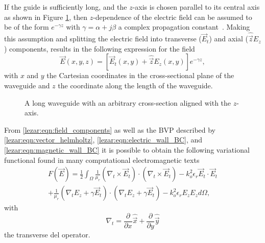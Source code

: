 If the guide is sufficiently long, and the $z$-axis is chosen parallel
to its central axis as shown in Figure \ref{lezar:fig:long_waveguide}, then
$z$-dependence of the electric field can be assumed to be of the form
$e^{-\gamma z}$ with $\gamma = \alpha + j\beta$ a complex
propagation constant~\cite{PelosiCoccioliSelleri1998,
Poz2005}.  Making this assumption and splitting the electric field
into transverse ($\vec{E}_t$) and axial ($\hat{\vec{z}}E_z$) components,
results in the following expression for the field
\begin{equation}
    \label{lezar:eqn:field_components}
    \vec{E}(x,y,z) = [\vec{E}_t(x,y) + \hat{\vec{z}}E_z(x,y)]e^{-\gamma z},
\end{equation}
with $x$ and $y$ the Cartesian coordinates in the cross-sectional plane of the
waveguide and $z$ the coordinate along the length of the waveguide.

\begin{figure}
 \centering
 \caption{A long waveguide with an arbitrary cross-section aligned with the $z$-axis.}
 \label{lezar:fig:long_waveguide}
\end{figure}

From \eqref{lezar:eqn:field_components} as well as the BVP described by
\eqref{lezar:eqn:vector_helmholtz}, \eqref{lezar:eqn:electric_wall_BC}, and
\eqref{lezar:eqn:magnetic_wall_BC} it is possible to obtain the following
variational functional found in many computational electromagnetic
texts
\cite{Jin2002, PelCoc1998}
\begin{multline}
    \label{lezar:eqn:functional}
    F(\vec{E}) = \frac{1}{2}\int_{\Omega}\frac{1}{\mu_r}(\nabla_t\times{\vec{E}_t})\cdot(\nabla_t\times{\vec{E}_t}) -k_o^2\epsilon_r\vec{E}_t\cdot{\vec{E}_t}\\
    +\frac{1}{\mu_r}(\nabla_t{E_z} + \gamma\vec{E}_t)\cdot(\nabla_t{E_z} + \gamma\vec{E}_t)
    -k_o^2\epsilon_r E_z{E_z} d\Omega,
\end{multline}
with
\begin{equation}
    \nabla_t = \frac{\partial}{\partial x}\hat{\vec{x}} + \frac{\partial}{\partial
    y}\hat{\vec{y}}
\end{equation}
the transverse del operator.

